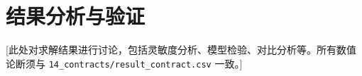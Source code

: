 \section{结果分析与验证}
\label{sec:analysis}

[此处对求解结果进行讨论，包括灵敏度分析、模型检验、对比分析等。所有数值论断须与 \texttt{14_contracts/result_contract.csv} 一致。]
